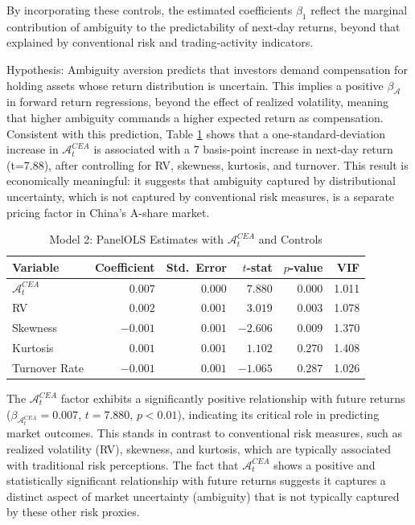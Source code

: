 \documentclass[preprint,12pt,authoryear]{elsarticle}
\renewcommand{\textcolor}[2]{\begingroup\color{#1}#2\endgroup}
\begin{document}
By incorporating these controls, the estimated coefficients \(\beta_1\) reflect the marginal contribution of ambiguity to the predictability of next‐day returns, beyond that explained by conventional risk and trading‐activity indicators.

\textcolor{red}{Hypothesis: Ambiguity aversion predicts that investors demand compensation for holding assets whose return distribution is uncertain. This implies a positive $\beta_{\mathcal{A}}$ in forward return regressions, beyond the effect of realized volatility, meaning that higher ambiguity commands a higher expected return as compensation. Consistent with this prediction, Table \ref{tab:panelols_model2} shows that a one-standard-deviation increase in $\mathcal{A}^{CEA}_t$ is associated with a 7 basis-point increase in next-day return (t=7.88), after controlling for RV, skewness, kurtosis, and turnover. This result is economically meaningful: it suggests that ambiguity captured by distributional uncertainty, which is not captured by conventional risk measures, is a separate pricing factor in China's A-share market.}

\begin{table}[h!]
  \centering
\caption{Model 2: PanelOLS Estimates with \(\mathcal{A}^{CEA}_t\) and Controls}
  \label{tab:panelols_model2}
  \begin{tabularx}{\textwidth}{Xrrrrr}
    \toprule
    Variable         & Coefficient & Std.\ Error & \(t\)-stat & \(p\)-value & VIF    \\
    \midrule
    \(\mathcal{A}^{CEA}_t\) & \(0.007\)   & \(0.000\)   & \(7.880\)   & \(0.000\)   & 1.011  \\
    RV               & \(0.002\)   & \(0.001\)   & \(3.019\)   & \(0.003\)   & 1.078  \\
    Skewness         & \(-0.001\)  & \(0.001\)   & \(-2.606\)  & \(0.009\)   & 1.370  \\
    Kurtosis         & \(0.001\)   & \(0.001\)   & \(1.102\)   & \(0.270\)   & 1.408  \\
    Turnover Rate    & \(-0.001\)  & \(0.001\)   & \(-1.065\)  & \(0.287\)   & 1.026  \\
    \bottomrule
  \end{tabularx}
\end{table}

The $\mathcal{A}^{CEA}_t$ factor exhibits a significantly positive relationship with future returns (\(\beta_{\mathcal{A}^{CEA}_t} = 0.007\), \(t = 7.880\), \(p < 0.01\)), indicating its critical role in predicting market outcomes. This stands in contrast to conventional risk measures, such as realized volatility (RV), skewness, and kurtosis, which are typically associated with traditional risk perceptions. The fact that $\mathcal{A}^{CEA}_t$ shows a positive and statistically significant relationship with future returns suggests it captures a distinct aspect of market uncertainty (ambiguity) that is not typically captured by these other risk proxies.
\end{document}
